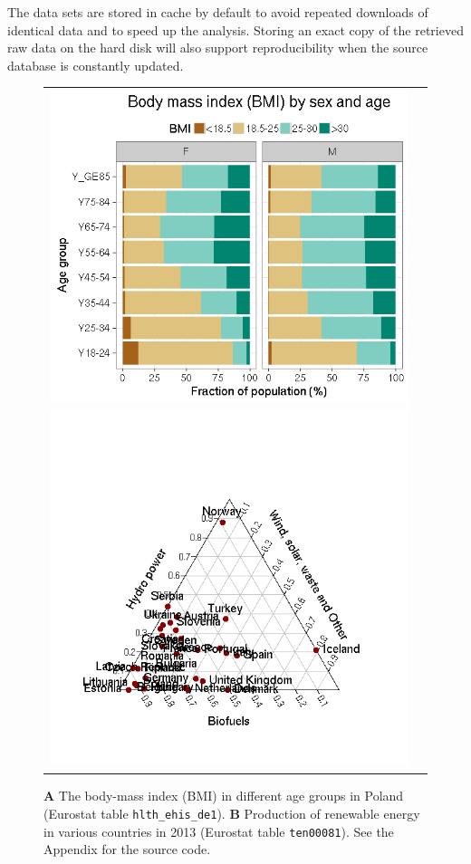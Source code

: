 The data sets are stored in cache by default to avoid repeated
downloads of identical data and to speed up the analysis. Storing
an exact copy of the retrieved raw data on the hard disk will also
support reproducibility when the source database is constantly
updated.



\begin{figure}
\begin{center}
\begin{tabular}{cc}
\includegraphics{2015-manu-bmi-1}
\includegraphics{2015-manu-energy-1}
\end{tabular}
\end{center}
\caption{{\bf A} The body-mass index (BMI) in different age groups in Poland (Eurostat table \texttt{hlth\_ehis\_de1}). {\bf B} Production of renewable energy in various countries in 2013 (Eurostat table \texttt{ten00081}). See the Appendix for the source code.}
\label{fig:bmi}
\end{figure}
